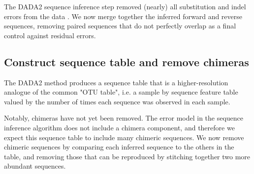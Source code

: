 The DADA2 sequence inference step removed (nearly) all substitution and
indel errors from the data \cite{dada2}. We now merge together the inferred forward
and reverse sequences, removing paired sequences that do not perfectly
overlap as a final control against residual errors.

\begin{knitrout}
\color{fgcolor}\begin{kframe}
\begin{alltt}
 \hlkwb{<-} 
\end{alltt}
\end{kframe}
\end{knitrout}

\subsection*{Construct sequence table and remove chimeras}

The DADA2 method produces a sequence table that is a higher-resolution
analogue of the common "OTU table", i.e. a sample by sequence feature
table valued by the number of times each sequence was observed in each sample.

\begin{knitrout}
\color{fgcolor}\begin{kframe}
\begin{alltt}
 \hlkwb{<-} \hlstd{(mergers[}\hlopt{!}\hlstd{(}\hlstd{,} \hlstd{(mergers))])}
\end{alltt}
\end{kframe}
\end{knitrout}

Notably, chimeras have not yet been removed. The error model in the
sequence inference algorithm does not include a chimera component, and
therefore we expect this sequence table to include many chimeric sequences.
We now remove chimeric sequences by comparing each inferred sequence to the
others in the table, and removing those that can be reproduced by
stitching together two more abundant sequences.

\begin{knitrout}
\color{fgcolor}\begin{kframe}
\begin{alltt}
 \hlkwb{<-} 
\end{alltt}
\end{kframe}
\end{knitrout}

